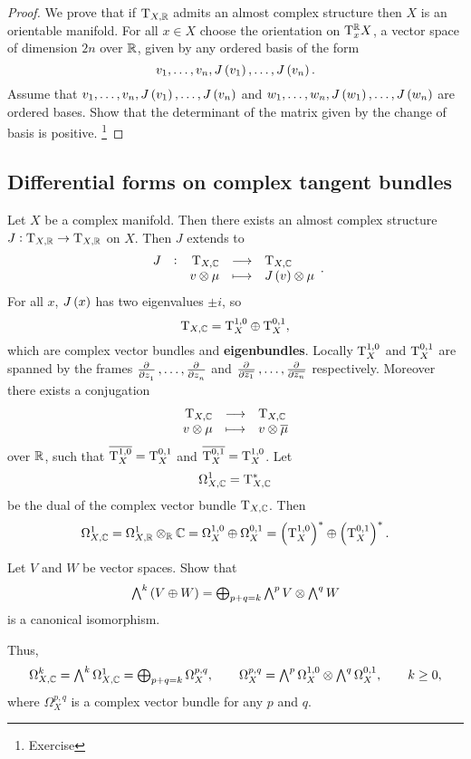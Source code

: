 \begin{proof}
We prove that if $ \mathrm{T}_{X, \mathbb{R}} $ admits an almost complex structure then $ X $ is an orientable manifold. For all $ x \in X $ choose the orientation on $ \mathrm{T}_x^{\mathbb{R}} X $, a vector space of dimension $ 2n $ over $ \mathbb{R} $, given by any ordered basis of the form
$$ v_1, \dots, v_n, J\br{v_1}, \dots, J\br{v_n}. $$
Assume that $ v_1, \dots, v_n, J\br{v_1}, \dots, J\br{v_n} $ and $ w_1, \dots, w_n, J\br{w_1}, \dots, J\br{w_n} $ are ordered bases. Show that the determinant of the matrix given by the change of basis is positive. \footnote{Exercise}
\end{proof}

\pagebreak

\subsection{Differential forms on complex tangent bundles}

Let $ X $ be a complex manifold. Then there exists an almost complex structure $ J : \mathrm{T}_{X, \mathbb{R}} \to \mathrm{T}_{X, \mathbb{R}} $ on $ X $. Then $ J $ extends to
$$ \function[J]{\T_{X, \CC}}{\T_{X, \CC}}{v \otimes \mu}{J\br{v} \otimes \mu}. $$
For all $ x $, $ J\br{x} $ has two eigenvalues $ \pm i $, so
$$ \mathrm{T}_{X, \mathbb{C}} = \mathrm{T}_X^{1, 0} \oplus \mathrm{T}_X^{0, 1}, $$
which are complex vector bundles and \textbf{eigenbundles}. Locally $ \mathrm{T}_X^{1, 0} $ and $ \mathrm{T}_X^{0, 1} $ are spanned by the frames $ \tpd{}{z_1}, \dots, \tpd{}{z_n} $ and $ \tpd{}{\overline{z_1}}, \dots, \tpd{}{\overline{z_n}} $ respectively. Moreover there exists a conjugation
$$ \function{\T_{X, \CC}}{\T_{X, \CC}}{v \otimes \mu}{v \otimes \overline{\mu}} $$
over $ \mathbb{R} $, such that $ \overline{\mathrm{T}_X^{1, 0}} = \mathrm{T}_X^{0, 1} $ and $ \overline{\mathrm{T}_X^{0, 1}} = \mathrm{T}_X^{1, 0} $. Let
$$ \Omega_{X, \mathbb{C}}^1 = \mathrm{T}_{X, \mathbb{C}}^* $$
be the dual of the complex vector bundle $ \mathrm{T}_{X, \mathbb{C}} $. Then
$$ \Omega_{X, \CC}^1 = \Omega_{X, \RR}^1 \otimes_\RR \CC = \Omega_X^{1, 0} \oplus \Omega_X^{0, 1} = \br{\T_X^{1, 0}}^* \oplus \br{\T_X^{0, 1}}^*. $$

\begin{exercise*}
Let $ V $ and $ W $ be vector spaces. Show that
$$ \ext^k\br{V \oplus W} = \bigoplus_{p + q = k} \ext^pV \otimes \ext^qW $$
is a canonical isomorphism.
\end{exercise*}


Thus,
$$ \Omega_{X, \mathbb{C}}^k = \textstyle\bigwedge^k\Omega_{X, \mathbb{C}}^1 = \bigoplus_{p + q = k} \Omega_X^{p, q}, \qquad \Omega_X^{p, q} = \textstyle\bigwedge^p\Omega_X^{1, 0} \otimes \textstyle\bigwedge^q\Omega_X^{0, 1}, \qquad k \ge 0, $$
where $ \Omega_X^{p, q} $ is a complex vector bundle for any $ p $ and $ q $.

